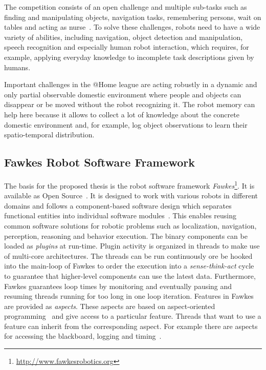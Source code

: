 \documentclass[a4paper,11pt]{article}
\begin{document}
The competition consists of an open challenge and multiple sub-tasks
such as finding and manipulating objects, navigation tasks,
remembering persons, wait on tables and acting as
nurse~\cite{athome-rules}. To solve these challenges, robots need to
have a wide variety of abilities, including navigation, object
detection and manipulation, speech recognition and especially human
robot interaction, which requires, for example, applying everyday
knowledge to incomplete task descriptions given by humans.

Important challenges in the @Home league are acting robustly in a
dynamic and only partial observable domestic environment where people
and objects can disappear or be moved without the robot recognizing
it. The robot memory can help here because it allows to collect a lot
of knowledge about the concrete domestic environment and, for example,
log object observations to learn their spatio-temporal distribution.

\subsection{Fawkes Robot Software Framework}
\label{sec:fawkes}
The basis for the proposed thesis is the robot software framework
\emph{Fawkes}\footnote{\url{http://www.fawkesrobotics.org}}. It is
available as Open Source~\cite{FawkesDesign}.
It is designed to work with
various robots in different domains and follows a component-based
software design which separates functional entities into individual
software modules~\cite{component}. This enables reusing common
software solutions for robotic problems such as localization,
navigation, perception, reasoning and behavior execution. The binary
components can be loaded as \emph{plugins} at run-time.
%
Plugin activity is organized in threads to make use of multi-core
architectures. The threads can be run continuously ore be hooked into
the main-loop of Fawkes to order the execution into a
\emph{sense-think-act} cycle to guarantee that higher-level components
can use the latest data. Furthermore, Fawkes guarantees loop times by
monitoring and eventually pausing and resuming threads running for too
long in one loop iteration.
Features in Fawkes are provided as \textit{aspects}. These aspects are
based on aspect-oriented programming~\cite{aspect_oriented} and give
access to a particular feature. Threads that want to use a feature can
inherit from the corresponding aspect. For example there are aspects
for accessing the blackboard, logging and timing~\cite{tnthesis}.
\end{document}
